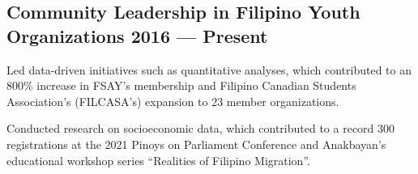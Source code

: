 \subsection{Community Leadership in Filipino Youth Organizations \hfill 2016 --- Present}
\begin{zitemize}
\item Led data-driven initiatives such as quantitative analyses, which contributed to an 800\% increase in FSAY’s
membership and Filipino Canadian Students Association’s (FILCASA’s) expansion to 23 member organizations.
\item  Conducted research on socioeconomic data, which contributed to a record 300 registrations at the 2021 Pinoys
on Parliament Conference and Anakbayan’s educational workshop series “Realities of Filipino Migration”.
\end{zitemize}